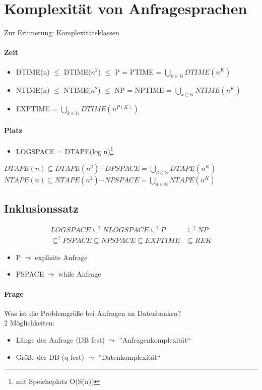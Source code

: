 \documentclass[12pt, a4paper]{article}
\begin{document}
\section*{Komplexität von Anfragesprachen}

Zur Erinnerung: Komplexitätsklassen

\paragraph{Zeit}
\begin{itemize}
	\item DTIME(n) $\le$ DTIME($n^2$) $\le$ P = PTIME = $\bigcup_{k \in \mathbb{N}} DTIME(n^K)$
	\item NTIME(n) $\le$ NTIME($n^2$) $\le$ NP = NPTIME = $\bigcup_{k \in \mathbb{N}} NTIME(n^K)$
	\item EXPTIME = $\bigcup_{k \in \mathbb{N}} DTIME(n^{P(K)})$
\end{itemize}

\paragraph{Platz}
\begin{itemize}
	\item LOGSPACE = DTAPE(log n)\footnote{mit Speicheplatz O(S(n))}
\end{itemize}

$DTAPE(n) \subseteq DTAPE(n^2) \cdots DPSPACE = \bigcup_{d \in \mathbb{N}} DTAPE(n^K)$ \\
$NTAPE(n) \subseteq NTAPE(n^2) \cdots NPSPACE = \bigcup_{d \in \mathbb{N}} NTAPE(n^K)$ 

\subsection*{Inklusionssatz}

\begin{align*}
LOGSPACE \subseteq^? NLOGSPACE \subseteq^? P &\subseteq^? NP  \\
\subseteq^? PSPACE \subseteq NPSPACE \subseteq EXPTIME &\subseteq REK
\end{align*}

\begin{itemize}
\item P $\leadsto$ explizite Anfrage
\item PSPACE $\leadsto$ while Anfrage
\end{itemize}

\paragraph{Frage}
Was ist die Problemgröße bei Anfragen an Datenbanken? \\
2 Möglichkeiten:
\begin{itemize}
	\item Länge der Anfrage (DB fest) $\leadsto$ ''Anfragenkomplexität``
	\item Größe der DB (q fest) $\leadsto$ ''Datenkomplexität``
\end{itemize}
\end{document}
